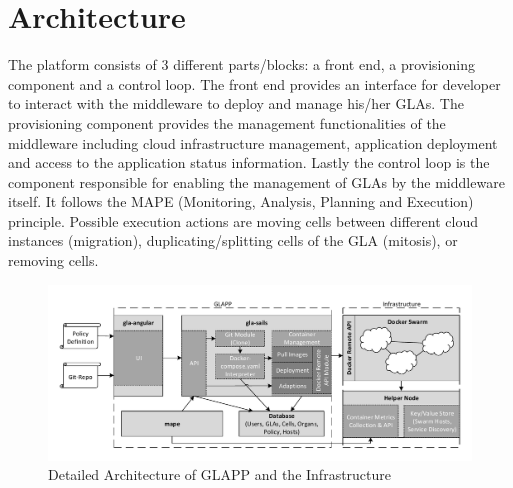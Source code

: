 \documentclass{seal_thesis}
\begin{document}
\section{Architecture}
The platform consists of 3 different parts/blocks: a front end, a provisioning component and a control loop.
The front end provides an interface for developer to interact with the middleware to deploy and manage his/her GLAs.
The provisioning component provides the management functionalities of the middleware including cloud infrastructure management, application deployment and access to the application status information.
Lastly the control loop is the component responsible for enabling the management of GLAs by the middleware itself.
It follows the MAPE (Monitoring, Analysis, Planning and Execution) principle.
Possible execution actions are moving cells between different cloud instances (migration), duplicating/splitting cells of the GLA (mitosis), or removing cells.

\begin{figure}[!ht]
\centering
	\includegraphics[width=\textwidth]{detailed_architecture.pdf}
	\caption{Detailed Architecture of GLAPP and the Infrastructure}
	\label{fig:detailed}
\end{figure}

\noindent{}


\end{document}
